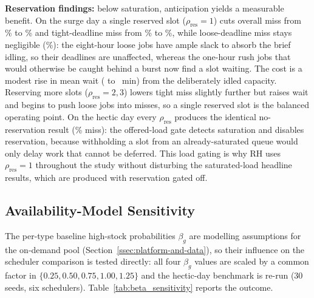 {\textbf{Reservation findings:} below saturation, anticipation yields a measurable benefit. On the surge day a single reserved slot ($\rho_{\mathrm{res}}=1$) cuts overall miss from \ResSurgeOffMiss\% to \ResSurgeOnMiss\% and tight-deadline miss from \ResSurgeOffTight\% to \ResSurgeOnTight\%, while loose-deadline miss stays negligible (\ResSurgeOnLoose\%): the eight-hour loose jobs have ample slack to absorb the brief idling, so their deadlines are unaffected, whereas the one-hour rush jobs that would otherwise be caught behind a burst now find a slot waiting. The cost is a modest rise in mean wait (\ResSurgeOffWait{} to \ResSurgeOnWait~min) from the deliberately idled capacity. Reserving more slots ($\rho_{\mathrm{res}}=2,3$) lowers tight miss slightly further but raises wait and begins to push loose jobs into misses, so a single reserved slot is the balanced operating point. On the hectic day every $\rho_{\mathrm{res}}$ produces the identical no-reservation result (\ResHecticGateMiss\% miss): the offered-load gate detects saturation and disables reservation, because withholding a slot from an already-saturated queue would only delay work that cannot be deferred. This load gating is why RH uses $\rho_{\mathrm{res}}=1$ throughout the study without disturbing the saturated-load headline results, which are produced with reservation gated off.


\subsection{Availability-Model Sensitivity}
\label{ssec:availability-model-sensitivity}

The per-type baseline high-stock probabilities $\beta_g$ are modelling assumptions for the on-demand pool (Section~\ref{ssec:platform-and-data}), so their influence on the scheduler comparison is tested directly: all four $\beta_g$ values are scaled by a common factor in $\{0.25, 0.50, 0.75, 1.00, 1.25\}$ and the hectic-day benchmark is re-run (30 seeds, six schedulers). Table~\ref{tab:beta_sensitivity} reports the outcome.

\begin{table}[htbp]
\centering
\caption[Availability-model sensitivity]{Availability-model ($\beta_g$) sensitivity on the hectic day ($C_{\max}=5$, 30 seeds). All four baseline high-stock probabilities are scaled by the factor in the first column; the baseline model is $\times 1.00$. Effective miss counts a job unfinished at the end of the 24-hour window as missed (every deadline in the instance falls before the window end), so the metric is immune to completion censoring at the extreme scales; the wait column, by contrast, is conditional on completion, which is why it is non-monotone across the two inoperable rows.}
\label{tab:beta_sensitivity}
\footnotesize
\setlength{\tabcolsep}{4pt}

\normalsize
\end{table}

}

